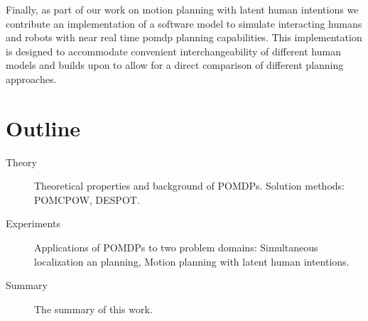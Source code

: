 Finally, as part of our work on motion planning with latent human intentions
we contribute an implementation of a software model to simulate
interacting humans and robots with near real time \ac{pomdp} planning
capabilities. This implementation is designed to accommodate convenient
interchangeability of different human models and builds upon \pomdpsjl to allow
for a direct comparison of different planning approaches.

\section{Outline}

\begin{description}
  \item[Theory] Theoretical properties and background of POMDPs. Solution methods: POMCPOW, DESPOT.
  \item[Experiments] Applications of POMDPs to two problem domains: Simultaneous localization an planning, Motion planning with latent human intentions.
  \item[Summary] The summary of this work.
\end{description}
